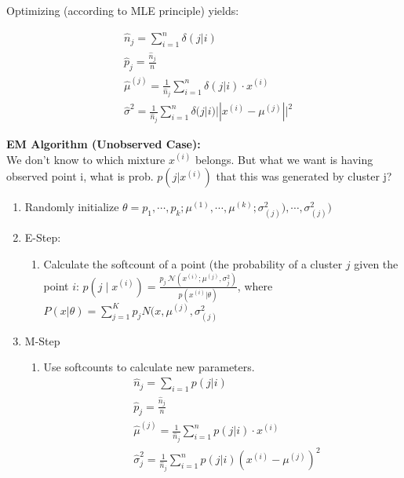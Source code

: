 Optimizing (according to MLE principle) yields:

\begin{align*}
&\hat{n}_j = \sum_{i=1}^n \delta(j|i)\\
&\hat{p}_j = \frac{\hat{n}_j}{n}\\
&\hat{\mu}^{(j)}= \frac{1}{\hat{n}_j} \sum
_{i=1}^n \delta(j|i) \cdot x^{(i)}\\
&\hat{\sigma}^2 = \frac{1}{\hat{n}_j}\sum_{i=1}^n \delta(j|i) || x^{(i)} - \mu^{(j)}||^2
\end{align*}

\textbf{EM Algorithm (Unobserved Case):}\\
We don't know to which mixture $x^{(i)}$ belongs. But what we want is  
having observed point i, what is prob. $p(j|x^{(i)})$ that this was generated by cluster j?


\begin{enumerate}
\item Randomly initialize $\theta={p_1,\cdots,p_k;\mu^{(1)},\cdots,\mu^{(k)};\sigma^2_{(j)}),\cdots,\sigma^2_{(j)})}$
\item E-Step:
	\begin{enumerate}
		\item Calculate the softcount of a point (the probability of a cluster $j$ given the point $i$: $\displaystyle  p(j \mid x^{(i)}) = \frac{p_ j ~  \mathcal{N}(x^{(i)} ; \mu ^{(j)}, \sigma _ j^2)}{p(x^{(i)} | \theta )}$, where $P(x|\theta)=\sum_{j=1}^K p_j N(x,\mu^{(j)},\sigma^2_{(j)}$
	\end{enumerate}
\item M-Step
	\begin{enumerate}
		\item  Use softcounts to calculate new parameters.
		\begin{align*}
		&\hat{n}_j = \sum_{i=1} p(j|i)\\
		&\hat{p}_j= \frac{\hat{n}_j}{n}\\
		&\hat{\mu}^{(j)}= \frac{1}{\hat{n}_j} \sum
_{i=1}^n p(j|i) \cdot x^{(i)}\\
		&\hat{\sigma}^2_j=\frac{1}{\hat{n}_j}\sum_{i=1}^n p(j|i) (x^{(i)} - \mu^{(j)})^2
		\end{align*}
	\end{enumerate}
\end{enumerate}